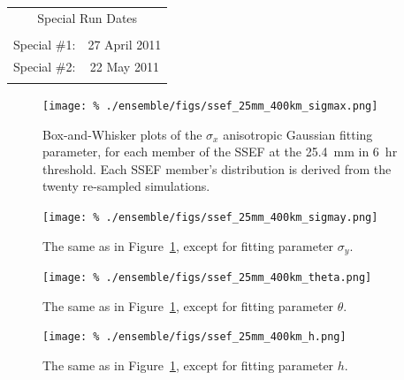 \begin{table}[cc]
\begin{tabular}{||c c||}
        \multicolumn{2}{||c||}{\Large Special Run Dates} \\
        \vspace{\baselineskip} & \vspace{\baselineskip} \\
        Special \#1: & 27 April 2011 \\
        Special \#2: & 22 May 2011 \\
        \vspace{\baselineskip} & \vspace{\baselineskip} \\
        \hline \hline
    \end{tabular}
\end{table}





\clearpage
\begin{figure}[cc]
    \centering
    \texttt{[image: \%
    ./ensemble/figs/ssef\_25mm\_400km\_sigmax.png]}\\
    \caption{Box-and-Whisker plots of the $\sigma_x$ anisotropic Gaussian fitting parameter, for each member of the SSEF at the \mbox{25.4 mm} in \mbox{6 hr} threshold.
    Each SSEF member's distribution is derived from the twenty re-sampled simulations.}
    \label{sigmax-25mm-400km-dist}
\end{figure}


\clearpage
\begin{figure}[cc]
    \centering
    \texttt{[image: \%
    ./ensemble/figs/ssef\_25mm\_400km\_sigmay.png]}\\
    \caption{The same as in \mbox{Figure \ref{sigmax-25mm-400km-dist}}, except for fitting parameter $\sigma_y$.}
    \label{sigmay-25mm-400km-dist}
\end{figure}


\clearpage
\begin{figure}[cc]
    \centering
    \texttt{[image: \%
    ./ensemble/figs/ssef\_25mm\_400km\_theta.png]}\\
    \caption{The same as in \mbox{Figure \ref{sigmax-25mm-400km-dist}}, except for fitting parameter $\theta$.}
    \label{theta-25mm-400km-dist}
\end{figure}


\clearpage
\begin{figure}[cc]
    \centering
    \texttt{[image: \%
    ./ensemble/figs/ssef\_25mm\_400km\_h.png]}\\
    \caption{The same as in \mbox{Figure \ref{sigmax-25mm-400km-dist}}, except for fitting parameter $h$.}
    \label{h-25mm-400km-dist}
\end{figure}


